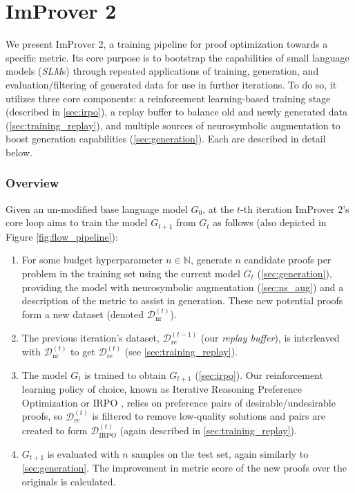 \chapter{ImProver 2}\label{chap:improver2}

\setlength{\parindent}{1em}

We present ImProver 2, a training pipeline for proof optimization towards a specific metric. Its core purpose is to bootstrap the capabilities of small language models (\textit{SLM}s) through repeated applications of training, generation, and evaluation/filtering of generated data for use in further iterations. To do so, it utilizes three core components: a reinforcement learning-based training stage (described in \ref{sec:irpo}), a replay buffer to balance old and newly generated data (\ref{sec:training_replay}), and multiple sources of neurosymbolic augmentation to boost generation capabilities (\ref{sec:generation}). Each are described in detail below. 


\subsection{Overview}
\label{sec:improver_spec}

Given an un-modified base language model $G_0$, at the $t$-th iteration ImProver 2's core loop aims to train the model $G_{t+1}$ from $G_t$ as follows (also depicted in Figure \ref{fig:flow_pipeline}):
\begin{enumerate}
    \item For some budget hyperparameter $n \in \mathbb{N}$, generate $n$ candidate proofs per problem in the training set using the current model $G_{t}$ (\ref{sec:generation}), providing the model with neurosymbolic augmentation (\ref{sec:ns_aug}) and a description of the metric to assist in generation. These new potential proofs form a new dataset (denoted $\mathcal{D}^{(t)}_{\mathrm{nr}}$). 

    \item The previous iteration's dataset, $\mathcal{D}^{(t-1)}_{\mathrm{re}}$ (our \textit{replay buffer}), is interleaved with $\mathcal{D}^{(t)}_{\mathrm{nr}}$ to get $\mathcal{D}^{(t)}_{\mathrm{re}}$ (see \ref{sec:training_replay}). 

    \item The model $G_t$ is trained to obtain $G_{t+1}$ (\ref{sec:irpo}). Our reinforcement learning policy of choice, known as Iterative Reasoning Preference Optimization or IRPO \cite{IRPO}, relies on preference pairs of desirable/undesirable proofs, so $\mathcal{D}^{(t)}_{\mathrm{re}}$ is filtered to remove low-quality solutions and pairs are created to form $\mathcal{D}^{(t)}_{\mathrm{IRPO}}$ (again described in \ref{sec:training_replay}). 

    \item $G_{t+1}$ is evaluated with $n$ samples on the test set, again similarly to \ref{sec:generation}. The improvement in metric score of the new proofs over the originals is calculated. 
\end{enumerate}

